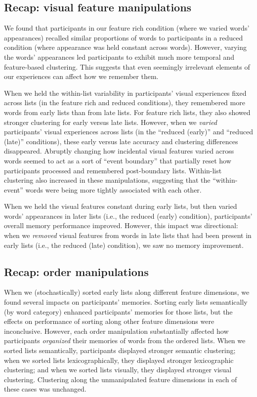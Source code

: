 \documentclass[11pt]{article}
\begin{document}
\subsection*{Recap: visual feature manipulations}

We found that participants in our feature rich condition (where we varied
words' appearances) recalled similar proportions of words to participants in a
reduced condition (where appearance was held constant across words). However,
varying the words' appearances led participants to exhibit much more temporal
and feature-based clustering. This suggests that even seemingly irrelevant
elements of our experiences can affect how we remember them.

When we held the within-list variability in participants' visual experiences
fixed across lists (in the feature rich and reduced conditions), they
remembered more words from early lists than from late lists. For feature rich
lists, they also showed stronger clustering for early versus late lists.
However, when we \textit{varied} participants' visual experiences across lists
(in the ``reduced (early)'' and ``reduced (late)'' conditions), these early
versus late accuracy and clustering differences disappeared. Abruptly changing
how incidental visual features varied across words seemed to act as a sort of
``event boundary'' that partially reset how participants processed and
remembered post-boundary lists. Within-list clustering also increased in these
manipulations, suggesting that the ``within-event'' words were being more tightly
associated with each other.

When we held the visual features constant during early lists, but then varied
words' appearances in later lists (i.e., the reduced (early) condition),
participants' overall memory performance improved. However, this impact was
directional: when we \textit{removed} visual features from words in late lists
that had been present in early lists (i.e., the reduced (late) condition), we
saw no memory improvement.

\subsection*{Recap: order manipulations}

When we (stochastically) sorted early lists along different feature dimensions,
we found several impacts on participants' memories. Sorting early lists
semantically (by word category) enhanced participants' memories for those
lists, but the effects on performance of sorting along other feature dimensions
were inconclusive. However, each order manipulation substantially affected how
participants \textit{organized} their memories of words from the ordered lists.
When we sorted lists semantically, participants displayed stronger semantic
clustering; when we sorted lists lexicographically, they displayed stronger
lexicographic clustering; and when we sorted lists visually, they displayed
stronger visual clustering. Clustering along the unmanipulated feature
dimensions in each of these cases was unchanged.
\end{document}
